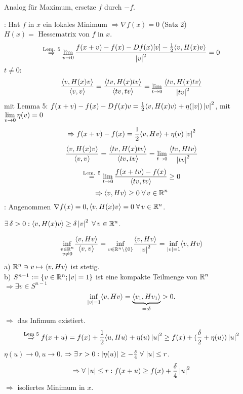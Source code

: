 \documentclass[../ana2.tex]{subfiles}
\begin{document}
\begin{bem}
    Analog für Maximum, ersetze \(f\) durch \(-f\).
\end{bem}
\begin{bew}
    \gqq{\(\Rightarrow\)}: Hat \(f\) in \(x\) ein lokales Minimum \(\Rightarrow \nabla f(x) = 0\)
    (Satz 2)\\
    \( H(x) = \) Hessematrix von \(f\) in \(x\).
    \[ \overset{\text{Lem. 5}}{\Rightarrow}
    \lim\limits_{v\rightarrow{}0} \frac{f(x+v) - f(x) - Df(x)[v] - \frac{1}{2} 
    \langle v, H(x)v \rangle}{\left|v\right|^2} = 0 \]
    \(t \neq 0:\)
    \[ \frac{\langle v, H(x)v \rangle}{\langle v, v \rangle} 
    = \frac{\langle tv, H(x)tv \rangle}{\langle tv, tv \rangle}
    = \lim\limits_{t\rightarrow{}0} \frac{ \langle tv, H(x)tv \rangle }{\left|tv\right|^2} \]
    mit Lemma 5: \( f(x+v) - f(x)-Df(x){v} = \frac{1}{2}
    \langle v, H(x)v \rangle + \eta(\left|v\right|)\left|v\right|^2 \), mit
    \( \lim\limits_{v\rightarrow{}0} \eta(v) = 0 \)
    \[ \Rightarrow f(x+v)-f(x) = \frac{1}{2} \langle v, Hv \rangle
    + \eta(v)\left|v\right|^2 \]
    \[ \frac{\langle v, H(x)v \rangle}{\langle v, v \rangle} 
    = \frac{\langle tv, H(x)tv \rangle}{\langle tv, tv \rangle}
    = \lim\limits_{t\rightarrow{}0} \frac{ \langle tv, Htv \rangle }{\left|tv\right|^2} \]
    \[ \overset{\text{Lem. 5}}{=} \lim\limits_{t\rightarrow{}0} 
    \frac{f(x+tv)-f(x)}{\langle tv, tv \rangle} \geq 0 \]
    \[ \Rightarrow \scalarprod{v}{Hv} \geq 0 \; \forall v \in \R^n \]
    \gqq{\(\Leftarrow\)}: Angenommen \( \nabla f(x) = 0, 
    \scalarprod{v}{H(x)v} = 0 \;\forall v\in \R^n \).\\
    \begin{beh}
        \( \exists \delta > 0: \scalarprod{v}{H(x)v} \geq \delta \abs{v}^2 \;\forall v\in \R^n \).
    \end{beh}
    \begin{align*}
        \underset{\substack{v\in\mathbb{R}^n\\v \neq 0}}{\inf} 
        \frac{\langle v, Hv \rangle}{\langle v, v \rangle}
        = \underset{v \in \mathbb{R}^n \setminus \{0\}}{\inf} 
        \frac{\langle v, Hv \rangle}{\left|v\right|^2}
        = \underset{\left|v\right| = 1}{\inf} \langle v, Hv \rangle
    \end{align*}
    a) \( \mathbb{R}^n \ni v \mapsto \langle v, Hv \rangle \) ist stetig.\\
    b) \( S^{n-1} := \{v \in \mathbb{R}^n; \left|v\right| = 1\} \) ist eine
    kompakte Teilmenge von \(\mathbb{R}^n\)\\    
    \( \Rightarrow \exists v \in S^{n-1} \)
    \[ \underset{\left|v\right| = 1}{\inf} \langle v, Hv \rangle 
    = \underbrace{\langle v_1, Hv_1 \rangle}_{=:\delta} > 0. \]    
    \( \Rightarrow \) das Infimum existiert.
    \[ \overset{\text{Lem 5}}{\Rightarrow} f(x+u) 
    = f(x) + \frac{1}{2} \langle u, Hu \rangle + \eta(u) \left|u\right|^2 
    \geq f(x) + (\frac{\delta}{2} + \eta(u))\left|u\right|^2 \]
    \( \eta(u) \rightarrow 0, u \rightarrow 0 \).
    \( \Rightarrow \exists r > 0: \abs{\eta(u)} \geq - \frac{\delta}{4} \;\forall \abs{u} \leq r \).
    \[ \Rightarrow \forall \abs{u} \leq r: f(x+u) \geq f(x)
    + \frac{\delta}{4}\abs{u}^2\]
    \(\Rightarrow\) isoliertes Minimum in \(x\).
\end{bew}
\end{document}
